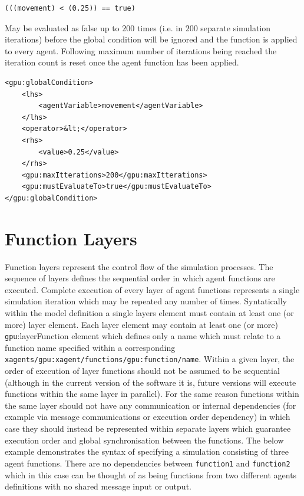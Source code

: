 \documentclass[11pt, a4paper, onecolumn, oneside]{report}
\begin{document}
\begin{verbatim}
(((movement) < (0.25)) == true)
\end{verbatim}
May be evaluated as false up to $200$ times (i.e. in $200$ separate simulation iterations) before the global condition will be ignored and the function is applied to every agent.
Following maximum number of iterations being reached the iteration count is reset once the agent function has been applied.

\begin{verbatim}
<gpu:globalCondition>
    <lhs>
        <agentVariable>movement</agentVariable>
    </lhs>
    <operator>&lt;</operator>
    <rhs>
        <value>0.25</value>
    </rhs>
    <gpu:maxItterations>200</gpu:maxItterations>
    <gpu:mustEvaluateTo>true</gpu:mustEvaluateTo>
</gpu:globalCondition>
\end{verbatim}


\section{Function Layers}
\label{sec:26}

Function layers represent the control flow of the simulation processes.
The sequence of layers defines the sequential order in which agent functions are executed.
Complete execution of every layer of agent functions represents a single simulation iteration which may be repeated any number of times.
Syntatically within the model definition a single layers element must contain at least one (or more) layer element.
Each layer element may contain at least one (or more) \texttt{gpu}:layerFunction element which defines only a name which must relate to a function name specified within a corresponding \texttt{xagents/gpu:xagent/functions/gpu:function/name}.
Within a given layer, the order of execution of layer functions should not be assumed to be sequential (although in the current version of the software it is, future versions will execute functions within the same layer in parallel).
For the same reason functions within the same layer should not have any communication or internal dependencies (for example via message communications or execution order dependency) in which case they should instead be represented within separate layers which guarantee execution order and global synchronisation between the functions.
The below example demonstrates the syntax of specifying a simulation consisting of three agent functions.
There are no dependencies between \texttt{function1} and \texttt{function2} which in this case can be thought of as being functions from two different agents definitions with no shared message input or output.
\end{document}
